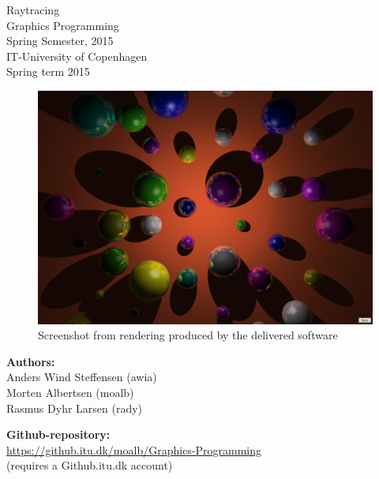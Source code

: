 \begin{titlepage}

\begin{center}

\huge{
Raytracing \\
Graphics Programming \\ 
Spring Semester, 2015 \\ 
\vspace*{8mm} }
\large{
IT-University of Copenhagen \\
Spring term 2015
}
\end{center}
\vspace*{7mm}

\begin{figure}[h!]
	\centering
	\includegraphics[width=1.0\linewidth]{Figures/GrandFinale.png}
	\caption{Screenshot from rendering produced by the delivered software}
\end{figure}



\vspace*{6mm}

\begin{center}
\begin{Large}
\textbf{Authors:} \\
\vspace*{2mm}
Anders Wind Steffensen (awia) \\
Morten Albertsen (moalb) \\ 
Rasmus Dyhr Larsen (rady)
\end{Large}
\end{center}
\vspace{3mm}
\begin{center}
\large
\textbf{Github-repository:} \\
\href{https://github.itu.dk/moalb/Graphics-Programming}{https://github.itu.dk/moalb/Graphics-Programming} \\
\normalsize 
(requires a Github.itu.dk account)
\end{center}

\end{titlepage}
\newpage